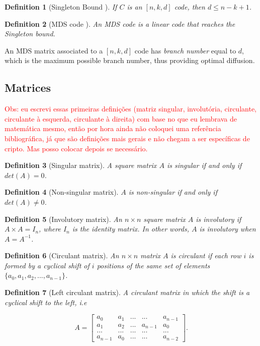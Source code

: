 \documentclass{report}
\newtheorem{definition}{Definition}{\bfseries}{\itshape}
\begin{document}
\begin{definition}[Singleton Bound \cite{SloaneBook}]
If $C$ is an $[n, k, d]$ code, then $d \leq n - k + 1$.
\end{definition}

\begin{definition}[MDS code \cite{SloaneBook}]\label{def:mds-code-singleton}
An \emph{MDS code} is a \emph{linear code} that reaches the \emph{Singleton bound}.
\end{definition}

An MDS matrix associated to a $[n, k, d]$ code has \emph{branch number} equal to $d$, which is the maximum possible branch number, thus providing optimal diffusion.

\subsection{Matrices}

\textcolor{red}{Obs: eu escrevi essas primeiras definições (matriz singular, involutória, circulante, circulante à esquerda, circulante à direita) com base no que eu lembrava de matemática mesmo, então por hora ainda não coloquei uma referência bibliográfica, já que são definições mais gerais e não chegam a ser específicas de cripto. Mas posso colocar depois se necessário.}

\begin{definition}[Singular matrix]
A square matrix $A$ is singular if and only if $det(A) = 0$.
\end{definition}

\begin{definition}[Non-singular matrix]
$A$ is non-singular if and only if $det(A) \neq 0$.
\end{definition}

\begin{definition}[Involutory matrix]
An $n \times n$ square matrix $A$ is involutory if $A \times A = I_n$, where $I_n$ is the identity matrix. In other words, $A$ is involutory when $A = A^{-1}$. 
\end{definition}

\begin{definition}[Circulant matrix]
An $n \times n$ matrix $A$ is circulant if each row $i$ is formed by a cyclical shift of $i$ positions of the same set of elements $\{a_0, a_1, a_2, ..., a_{n-1}\}$.
\end{definition}

\begin{definition}[Left circulant matrix]
A circulant matrix in which the shift is a cyclical shift to the left, i.e

$$
A = 
\begin{bmatrix}
a_0 & a_1 & ... & ... & a_{n-1}\\
a_1 & a_2 & ... & a_{n-1} & a_0\\
... & ... & ... & ... & ...\\
a_{n-1} & a_0 & ... & ... & a_{n-2}
\end{bmatrix}.
$$
\end{definition}
\end{document}
